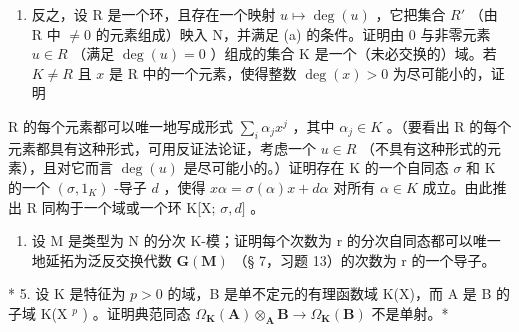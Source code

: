 \begin{enumerate}
\def\labelenumi{(\alph{enumi})}
\setcounter{enumi}{1}
\tightlist
\item
  反之，设 R 是一个环，且存在一个映射 \(u \mapsto \deg(u)\) ，它把集合 \(R'\) （由 R 中 \(\neq 0\) 的元素组成）映入 N，并满足 (a) 的条件。证明由 0 与非零元素 \(u \in R\) （满足 \(\deg(u) = 0\) ）组成的集合 K 是一个（未必交换的）域。若 \(K \neq R\) 且 \(x\) 是 R 中的一个元素，使得整数 \(\deg(x) > 0\) 为尽可能小的，证明
\end{enumerate}

R 的每个元素都可以唯一地写成形式 \(\sum_{i} \alpha_j x^j\) ，其中 \(\alpha_j \in K\) 。（要看出 R 的每个元素都具有这种形式，可用反证法论证，考虑一个 \(u \in R\) （不具有这种形式的元素），且对它而言 \(\deg(u)\) 是尽可能小的。）证明存在 K 的一个自同态 \(\sigma\) 和 K 的一个 \((\sigma, 1_K)\) -导子 \(d\) ，使得 \(x\alpha = \sigma(\alpha)x + d\alpha\) 对所有 \(\alpha \in K\) 成立。由此推出 R 同构于一个域或一个环 K{[}X; \(\sigma, d]\) 。

\begin{enumerate}
\def\labelenumi{\arabic{enumi}.}
\setcounter{enumi}{3}
\tightlist
\item
  设 M 是类型为 N 的分次 K-模；证明每个次数为 r 的分次自同态都可以唯一地延拓为泛反交换代数 \(\mathbf{G}(\mathbf{M})\) （§ 7，习题 13）的次数为 r 的一个导子。
\end{enumerate}

* 5. 设 K 是特征为 \(p > 0\) 的域，B 是单不定元的有理函数域 K(X)，而 A 是 B 的子域 K(X \(^{p}\) ) 。证明典范同态 \(\Omega_{\mathbf{K}}(\mathbf{A}) \otimes_{\mathbf{A}} \mathbf{B} \to \Omega_{\mathbf{K}}(\mathbf{B})\) 不是单射。*

\BourbakiExercisesSection

